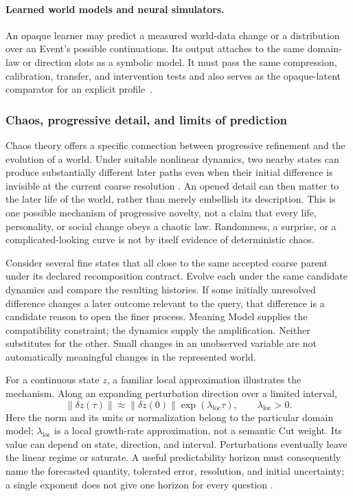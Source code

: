 \documentclass[10pt]{article}
\begin{document}
\paragraph{Learned world models and neural simulators.}
An opaque learner may predict a measured world-data change or a distribution
over an Event's possible continuations. Its output attaches to the same
domain-law or direction slots as a symbolic model. It must pass the same compression, calibration,
transfer, and intervention tests and also serves as the opaque-latent comparator
for an explicit profile~\cite{haSchmidhuber2018worldModels,
hafner2025dreamer,schrittwieser2020muzero}.

\subsubsection{Chaos, progressive detail, and limits of prediction}

Chaos theory offers a specific connection between progressive refinement and
the evolution of a world. Under suitable nonlinear dynamics, two nearby
states can produce substantially different later paths even when their
initial difference is invisible at the current coarse resolution
\cite{lorenz1963deterministic,may1974populations}. An opened detail can then
matter to the later life of the world, rather than merely embellish its
description. This is one possible mechanism of progressive novelty, not a
claim that every life, personality, or social change obeys a chaotic law.
Randomness, a surprise, or a complicated-looking curve is not by itself
evidence of deterministic chaos.

Consider several fine states that all close to the same accepted coarse
parent under its declared recomposition contract. Evolve each under the same
candidate dynamics and compare the resulting histories. If some initially
unresolved difference changes a later outcome relevant to the query, that
difference is a candidate reason to open the finer process. Meaning Model
supplies the compatibility constraint; the dynamics supply the amplification.
Neither substitutes for the other. Small changes in an unobserved variable
are not automatically meaningful changes in the represented world.

For a continuous state $z$, a familiar local approximation illustrates the
mechanism. Along an expanding perturbation direction over a limited interval,
\begin{equation}
  \lVert\delta z(\tau)\rVert
  \approx \lVert\delta z(0)\rVert
  \exp(\lambda_{\mathrm{loc}}\tau),
  \qquad \lambda_{\mathrm{loc}}>0.
  \label{eq:local-sensitive-divergence}
\end{equation}
Here the norm and its units or normalization belong to the particular domain
model; $\lambda_{\mathrm{loc}}$ is a local growth-rate approximation, not a
semantic Cut weight. Its value can depend on state, direction, and interval.
Perturbations eventually leave the linear regime or saturate. A useful
predictability horizon must consequently name the forecasted quantity,
tolerated error, resolution, and initial uncertainty; a single exponent does
not give one horizon for every question
\cite{lorenz1969multiscale,nese1989local,aurell1997finite}.
\end{document}
